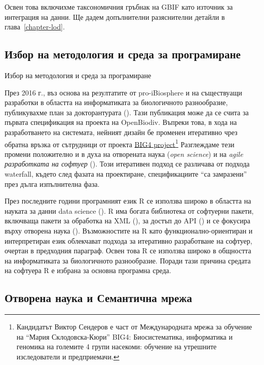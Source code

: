 Освен това включихме таксономичния гръбнак на GBIF \cite{gbif_secretariat_gbif_2017} като източник за интеграция на данни. Ще дадем допълнителни разяснителни детайли в глава~\ref{chapter-lod}.

\subsection*{Избор на методология и среда за програмиране}
 {Избор на методология и среда за програмиране}

През 2016 г., въз основа на резултатите от pro-iBiosphere и на съществуащи разработки в областта на информатиката за биологичното разнообразие, публикувахме план за докторантурата (\cite{senderov_open_2016}). Тази публикация може да се счита за първата спецификация на проекта на OpenBiodiv. Въпреки това, в хода на разработването на системата, нейният дизайн бе променен итеративно чрез обратна връзка от сътрудници от проекта \href {http://big4-project.eu}{BIG4 project}\footnote {Кандидатът Виктор Сендеров е част от Международната мрежа за обучение на ``Мария Склодовска-Кюри'' BIG4: Биосистематика, информатика и геномика на големите 4 групи насекоми: обучение на утрешните изследователи и предприемачи.} Разглеждаме тези промени положително и в духа на отворената наука (\emph {open science}) и на \emph{agile разработката на софтуер} (\cite {beck_manifesto_2001}). Този итеративен подход се различава от подхода waterfall, където след фазата на проектиране, спецификациите ``са замразени'' през дълга изпълнителна фаза.

През последните години програмният език R се използва широко в областта на науката за данни data science (\cite{r_core_team_r:_2016}). R има богата библиотека от софтуерни пакети, включваща пакети за обработка на XML (\cite{wickham_xml2:_2018}), за достъп до API (\cite{wickham_httr:_2017}) и се фокусира върху отворена наука (\cite{boettiger_building_2015}). Възможностите на R като функционално-ориентиран и интерпретиран език облекчават подхода за итеративно разработване на софтуер, очертан в предходния параграф. Освен това R се използва широко в общността на информатиката за биологичното разнообразие. Поради тази причина средата на софтуера R е избрана за основна програмна среда.

\subsection*{Отворена наука и Семантична мрежа}

